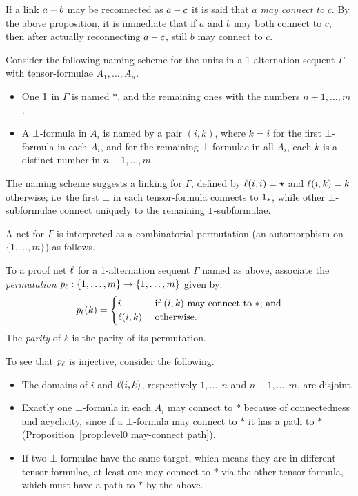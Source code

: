 \documentclass[conference,onecolumn]{IEEEtran}
\begin{document}
If a link $a-b$ may be reconnected as $a-c$ it is said that $a$ \emph{may connect to} $c$. 
%
By the above proposition, it is immediate that if $a$ and $b$ may both connect to $c$, then after actually reconnecting $a-c$, still $b$ may connect to $c$.



Consider the following naming scheme for the units in a 1-alternation sequent $\Gamma$ with tensor-formulae $A_1,\dotsc,A_n$.
%
\begin{itemize}

	\item
One $1$ in $\Gamma$ is named $*$, and the remaining ones with the numbers $n+1,\dotsc,m$.

	\item
A $\bot$-formula in $A_i$ is named by a pair $(i,k)$, where $k=i$ for the first $\bot$-formula in each $A_i$, and for the remaining $\bot$-formulae in all $A_i$, each $k$ is a distinct number in $n+1,\dotsc,m$.

\end{itemize}
%
The naming scheme suggests a linking for $\Gamma$, defined by $\ell(i,i)=\star$ and $\ell(i,k)=k$ otherwise; i.e\ the first $\bot$ in each tensor-formula connects to $1_{*}$, while other $\bot$-subformulae connect uniquely to the remaining $1$-subformulae.



A net for $\Gamma$ is interpreted as a combinatorial permutation (an automorphism on $\{1,\dotsc,m\}$) as follows.
%
\begin{definition}
\label{def:combinatorial permutation}
To a proof net $\ell$ for a 1-alternation sequent $\Gamma$ named as above, associate the \emph{permutation} $\mathit p_{\ell}:\{1,\dotsc,m\}\to\{1,\dotsc,m\}$ given by:
\[
	\mathit p_{\ell}(k) = 
	\begin{cases}
		i				& \text{ if $(i,k)$ may connect to $*$; and}
	\\	\ell(i,k)		& \text{ otherwise.}
	\end{cases}
\]
The \emph{parity} of $\ell$ is the parity of its permutation.
\end{definition}


To see that $\mathit p_{\ell}$ is injective, consider the following.
\begin{itemize}
	\item The domains of $i$ and $\ell(i,k)$, respectively $1,\dotsc,n$ and $n+1,\dotsc,m$, are disjoint.
	\item Exactly one $\bot$-formula in each $A_i$ may connect to $*$ because of connectedness and acyclicity, since if a $\bot$-formula may connect to $*$ it has a path to $*$ (Proposition~\ref{prop:level0 may-connect path}).
	\item If two $\bot$-formulae have the same target, which means they are in different tensor-formulae, at least one may connect to $*$ via the other tensor-formula, which must have a path to $*$ by the above.
\end{itemize}
\end{document}
